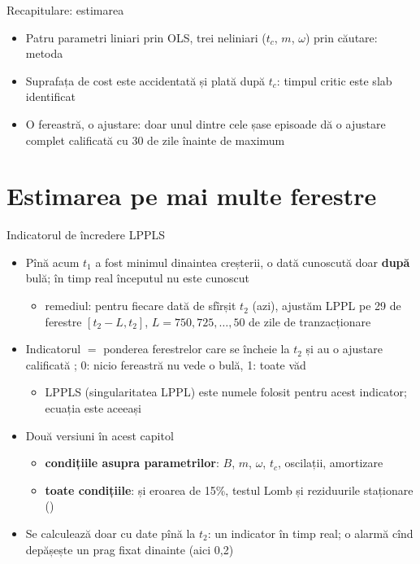 \begin{frame}{Recapitulare: estimarea}
\itemsize{\small}
\begin{itemize}
    \item Patru parametri liniari prin OLS, trei neliniari ($t_c$, $m$, $\omega$) prin căutare: metoda 
    \item Suprafața de cost este accidentată și plată după $t_c$: timpul critic este slab identificat
    \item O fereastră, o ajustare: doar unul dintre cele șase episoade dă o ajustare complet calificată cu 30 de zile înainte de maximum
\end{itemize}
\end{frame}


\section{Estimarea pe mai multe ferestre}

\begin{frame}{Indicatorul de încredere LPPLS}
\itemsize{\small}
\begin{itemize}
    \item Pînă acum $t_1$ a fost minimul dinaintea creșterii, o dată cunoscută doar \textbf{după} bulă; în timp real începutul nu este cunoscut
    \begin{itemize}
        \item remediul: pentru fiecare dată de sfîrșit $t_2$ (azi), ajustăm LPPL pe 29 de ferestre $[t_2 - L, t_2]$, $L = 750, 725, \dots, 50$ de zile de tranzacționare 
    \end{itemize}
    \item Indicatorul $=$ ponderea ferestrelor care se încheie la $t_2$ și au o ajustare calificată ; 0: nicio fereastră nu vede o bulă, 1: toate văd
    \begin{itemize}
        \item LPPLS (singularitatea LPPL) este numele folosit pentru acest indicator; ecuația este aceeași
    \end{itemize}
    \item Două versiuni în acest capitol
    \begin{itemize}
        \item \textbf{condițiile asupra parametrilor}: $B$, $m$, $\omega$, $t_c$, oscilații, amortizare
        \item \textbf{toate condițiile}: și eroarea de 15\%, testul Lomb și reziduurile staționare ()
    \end{itemize}
    \item Se calculează doar cu date pînă la $t_2$: un indicator în timp real; o alarmă cînd depășește un prag fixat dinainte (aici 0,2)
\end{itemize}
\end{frame}

